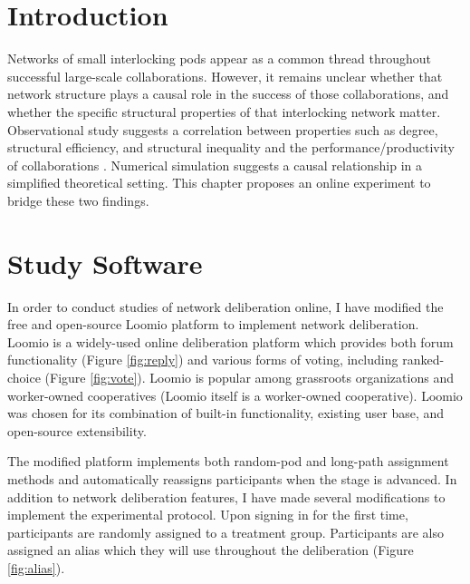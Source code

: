 \section{Introduction}
Networks of small interlocking pods appear as a common thread throughout
successful large-scale collaborations.
However, it remains unclear whether that network structure plays a causal role
in the success of those collaborations,
and whether the specific structural properties of that interlocking network matter.
Observational study suggests a correlation between properties such as degree,
structural efficiency, and structural inequality and the performance/productivity
of collaborations \cite{platt_network_2018}.
Numerical simulation suggests a causal relationship in a simplified theoretical
setting.
This chapter proposes an online experiment to bridge these two findings.


\section{Study Software}

In order to conduct studies of network deliberation online, I have modified the
free and open-source Loomio platform \cite{jackson_open_2016}
to implement network deliberation.
Loomio is a widely-used online deliberation platform which provides both
forum functionality (Figure \ref{fig:reply})
and various forms of voting, including ranked-choice (Figure \ref{fig:vote}).
Loomio is popular among grassroots organizations and worker-owned cooperatives
(Loomio itself is a worker-owned cooperative).
Loomio was chosen for its combination of built-in functionality,
existing user base, and open-source extensibility.

The modified platform implements both random-pod and long-path assignment methods
and automatically reassigns participants when the stage is advanced.
In addition to network deliberation features, I have made several modifications to implement
the experimental protocol.
Upon signing in for the first time,
participants are randomly assigned to a treatment group.
Participants are also assigned an alias which they will use throughout the
deliberation (Figure \ref{fig:alias}).

